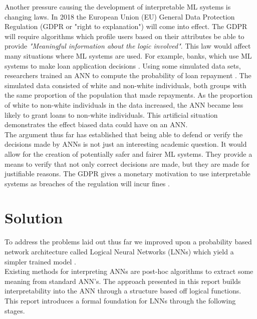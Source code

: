 Another pressure causing the development of interpretable ML systems is changing laws. In 2018 the European Union (EU) General Data Protection Regulation \cite{eu-dgpr} (GDPR or "right to explanation") will come into effect. The GDPR will require algorithms which profile users based on their attributes be able to provide \textit{"Meaningful information about the logic involved"}. This law would affect many situations where ML systems are used. For example, banks, which use ML systems to make loan application decisions \cite{goodman2016european}. Using some simulated data sets, researchers trained an ANN to compute the probability of loan repayment \cite{goodman2016european}. The simulated data consisted of white and non-white individuals, both groups with the same proportion of the population that made repayments. As the proportion of white to non-white individuals in the data increased, the ANN became less likely to grant loans to non-white individuals. This artificial situation demonstrates the effect biased data could have on an ANN.\\

The argument thus far has established that being able to defend or verify the decisions made by ANNs is not just an interesting academic question. It would allow for the creation of potentially safer and fairer ML systems. They provide a means to verify that not only correct decisions are made, but they are made for justifiable reasons. The GDPR gives a monetary motivation to use interpretable systems as breaches of the regulation will incur fines \cite{goodman2016european}.\\

\section{Solution}
To address the problems laid out thus far we improved upon a probability based network architecture called Logical Neural Networks (LNNs) which yield a simpler trained model \cite{LearningLogicalActivations}.\\

Existing methods for interpreting ANNs are post-hoc algorithms to extract some meaning from standard ANN's. The approach presented in this report builds interpretability into the ANN through a structure based off logical functions. This report introduces a formal foundation for LNNs through the following stages.

